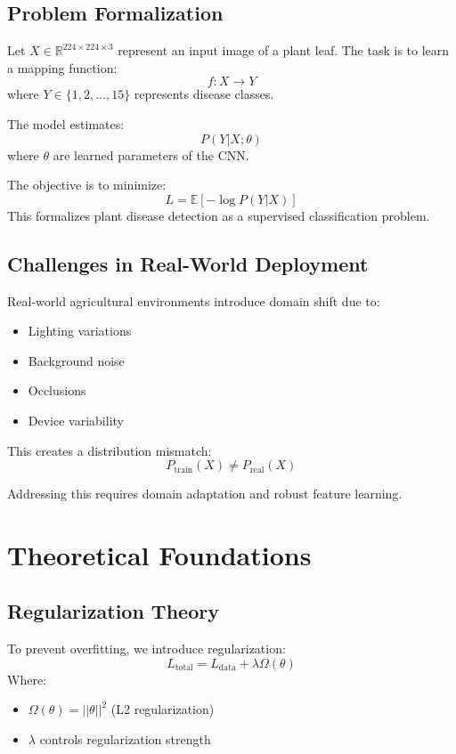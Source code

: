 \documentclass[journal,twocolumn,10pt]{IEEEtran}
\begin{document}
\subsection{Problem Formalization}
Let $X \in \mathbb{R}^{224 \times 224 \times 3}$ represent an input image of a plant leaf. The task is to learn a mapping function:
\begin{equation}
f: X \rightarrow Y
\end{equation}
where $Y \in \{1,2,...,15\}$ represents disease classes.

The model estimates:
\begin{equation}
P(Y|X; \theta)
\end{equation}
where $\theta$ are learned parameters of the CNN.

The objective is to minimize:
\begin{equation}
L = \mathbb{E}[-\log P(Y|X)]
\end{equation}
This formalizes plant disease detection as a supervised classification problem.

\subsection{Challenges in Real-World Deployment}
Real-world agricultural environments introduce domain shift due to:
\begin{itemize}
\item Lighting variations
\item Background noise
\item Occlusions
\item Device variability
\end{itemize}

This creates a distribution mismatch:
\begin{equation}
P_{\text{train}}(X) \neq P_{\text{real}}(X)
\end{equation}

Addressing this requires domain adaptation and robust feature learning.

\section{Theoretical Foundations}

\subsection{Regularization Theory}
To prevent overfitting, we introduce regularization:
\begin{equation}
L_{\text{total}} = L_{\text{data}} + \lambda\Omega(\theta)
\end{equation}
Where:
\begin{itemize}
\item $\Omega(\theta) = ||\theta||^2$ (L2 regularization)
\item $\lambda$ controls regularization strength
\end{itemize}
\end{document}
